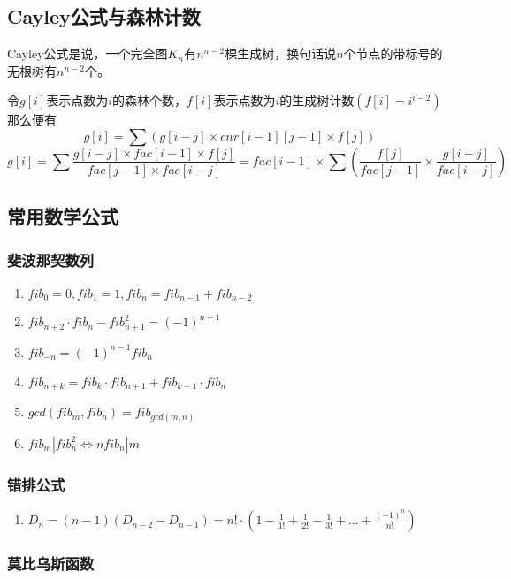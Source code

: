 \documentclass[landscape,a4paper]{article}
\begin{document}
\begin{spacing}{0.3}
\begin{multicols}{2}
		\subsection{Cayley公式与森林计数}
		Cayley公式是说，一个完全图$K_n$有$n^{n-2}$棵生成树，换句话说$n$个节点的带标号的无根树有$n^{n-2}$个。

令$g[i]$表示点数为$i$的森林个数，$f[i]$表示点数为$i$的生成树计数$(f[i]=i^{i-2})$
那么便有$$g[i]=\sum (g[i-j] \times cnr[i-1][j-1] \times f[j])$$
$$g[i]=\sum \frac{g[i-j] \times fac[i-1] \times f[j]}{fac[j-1] \times fac[i-j]}=fac[i-1] \times \sum (\frac{f[j]}{fac[j-1]} \times \frac{g[i-j]}{fac[i-j]})$$

\subsection{常用数学公式}

\subsubsection{斐波那契数列}

\begin{enumerate}
	\item $fib_0=0, fib_1=1, fib_n=fib_{n-1}+fib_{n-2}$
	\item $fib_{n+2} \cdot fib_n-fib_{n+1}^2=(-1)^{n+1}$
	\item $fib_{-n}=(-1)^{n-1}fib_n$
	\item $fib_{n+k}=fib_k \cdot fib_{n+1}+fib_{k-1} \cdot fib_n$
	\item $gcd(fib_m, fib_n)=fib_{gcd(m, n)}$
	\item $fib_m|fib_n^2\Leftrightarrow nfib_n|m$
\end{enumerate}

\subsubsection{错排公式}

\begin{enumerate}
	\item $D_n = (n-1)(D_{n-2}-D_{n-1})
	= n! \cdot (1-\frac{1}{1!}+\frac{1}{2!}-\frac{1}{3!}+\ldots+\frac{(-1)^n}{n!})$
\end{enumerate}

\subsubsection{莫比乌斯函数}


\end{multicols}
\end{spacing}
\end{document}
